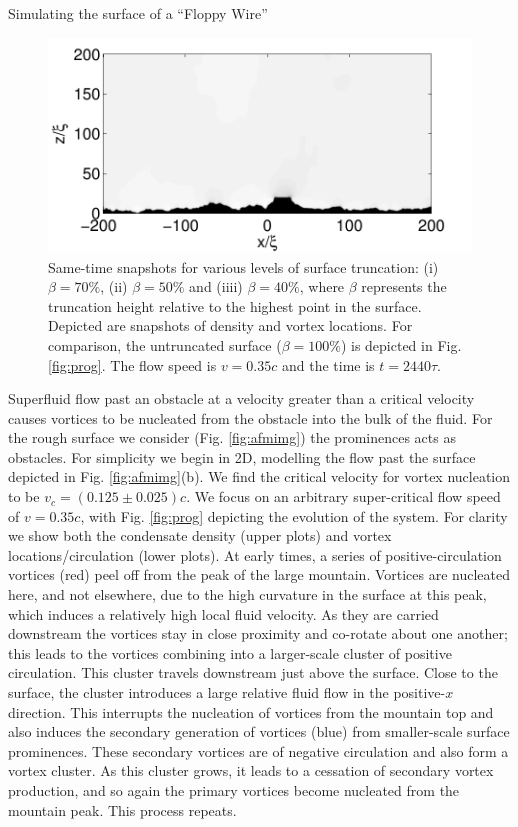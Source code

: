 \begin{chapter}{\label{cha:afm}Simulating the surface of a ``Floppy Wire''}
\begin{figure}
\includegraphics[width=0.35\linewidth]{./afm/figures/10th-35-2440}
\caption{\label{fig:trunc} Same-time snapshots for various levels of surface truncation: (i) $\beta=70\%$, (ii) $\beta=50\%$ and (iiii) $\beta=40\%$, where $\beta$ represents the truncation height relative to the highest point in the surface. Depicted are snapshots of density and vortex locations. For comparison, the untruncated surface ($\beta=100\%$) is depicted in Fig. \ref{fig:prog}.  The flow speed is $v=0.35c$ and the time is $t=2440\tau$.}
\end{figure}

Superfluid flow past an obstacle at a velocity greater than a critical velocity causes 
vortices to be nucleated from the obstacle into the bulk of the fluid.  For the rough surface we consider (Fig. \ref{fig:afmimg}) the prominences acts as obstacles.  For simplicity we begin in 2D, modelling the flow past the surface depicted in Fig. \ref{fig:afmimg}(b).  We find the critical velocity for vortex nucleation to be $v_c=(0.125\pm0.025) c$.   We focus on an arbitrary super-critical flow speed of $v=0.35c$, with Fig. \ref{fig:prog} depicting the evolution of the system.  For clarity we show both the condensate density (upper plots) and vortex locations/circulation (lower plots).  At early times, a series of positive-circulation vortices (red) peel off from the peak of the large mountain. Vortices are nucleated here, and not elsewhere, due to the high curvature in the surface at this peak, which induces a relatively high local fluid velocity.  As they are carried downstream the vortices stay in close proximity and co-rotate about one another; this leads to the vortices combining into a larger-scale cluster of positive circulation.  This cluster travels downstream just above the surface.  Close to the surface, the cluster introduces a large relative fluid flow in the positive-$x$ direction.  This interrupts the nucleation of vortices from the mountain top and also induces the secondary generation of vortices (blue) from smaller-scale surface prominences.  These secondary vortices are of negative circulation and also form a vortex cluster. As this cluster grows, it leads to a cessation of secondary vortex production, and so again the primary vortices become nucleated from the mountain peak.  This process repeats.


\end{chapter}
